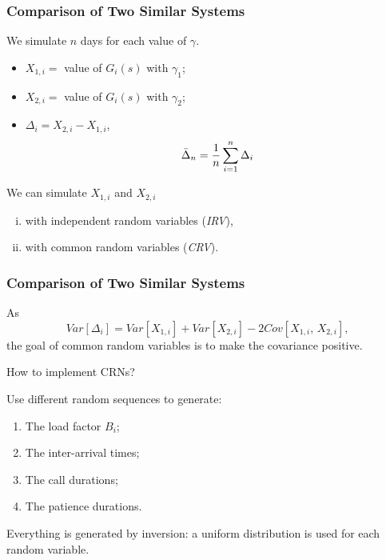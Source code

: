 \documentclass[t,usepdftitle=false]{beamer}
\begin{document}
\begin{frame}
	\frametitle{Comparison of Two Similar Systems}
	
	We simulate \(n\) days for each value of \(\gamma\).
	\begin{itemize}
		\item
		${X_{1,i}}=$ value of \(G_i(s)\) with \(\gamma_1\);
		\item
		${X_{2,i}}=$ value of \(G_i(s)\) with \(\gamma_2\);
		\item
		${\Delta_i} = X_{2,i}-X_{1,i}$,
		\[
		{\bar\Delta_n} = {1\over n} \sum_{i=1}^n \Delta_i
		\]
	\end{itemize}
	
	\mbox{}
	
	We can simulate \(X_{1,i}\) and \(X_{2,i}\)
	\begin{enumerate}[(i)]
		\item with independent random variables (\emph{IRV}),
		\item with common random variables (\emph{CRV}).
	\end{enumerate}
	
\end{frame}

\begin{frame}
	\frametitle{Comparison of Two Similar Systems}
	
	As
	\[
	Var[\Delta_i] = Var[X_{1,i}] + Var[X_{2,i}] - 2Cov[X_{1,i},\,X_{2,i}],
	\]
	the goal of common random variables is to make the covariance positive.
	
	\mbox{}
	
	How to implement CRNs?
	
	\mbox{}
	
	Use different random sequences to generate:
	\begin{enumerate}
		\item The load factor \(B_i\);
		\item The inter-arrival times;
		\item The call durations;
		\item The patience durations.
	\end{enumerate}
	Everything is generated by inversion: a uniform distribution is used for each random variable.
	
\end{frame}
\end{document}
